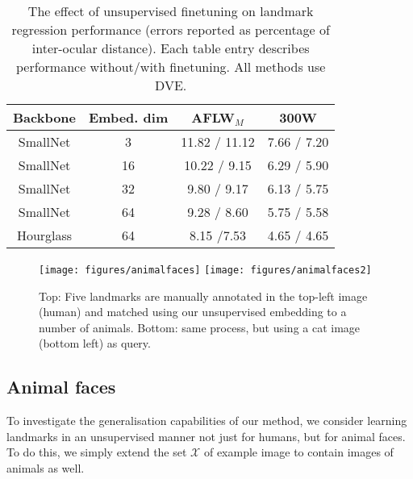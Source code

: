 \documentclass[10pt,twocolumn,letterpaper]{article}
\begin{document}
\begin{table}[t]
\setlength\tabcolsep{6.2pt}
\centering
\begin{tabular}{cccc}
\toprule
Backbone & Embed. dim & AFLW$_M$ & 300W \\
\midrule
SmallNet & 3  & 11.82 / 11.12 & 7.66 / 7.20 \\
SmallNet & 16 & 10.22 / 9.15 & 6.29 / 5.90  \\
SmallNet & 32 & 9.80 / 9.17 & 6.13 / 5.75  \\
SmallNet & 64 & 9.28 / 8.60 & 5.75 / 5.58  \\
Hourglass & 64 & 8.15 /7.53 & 4.65 / 4.65  \\
\bottomrule
\end{tabular}
\medskip
\caption{The effect of unsupervised finetuning on landmark regression performance (errors reported as percentage of inter-ocular distance). Each table entry describes performance without/with finetuning.  All methods use DVE.}
\vspace{-0.4cm}
\label{t:ftablation}
\end{table}

\begin{figure*}[t!]
\centering
\texttt{[image: figures/animalfaces]}\vspace{-2pt}
\texttt{[image: figures/animalfaces2]}
\caption{Top: Five landmarks are manually annotated in the top-left image (human) and matched using our unsupervised embedding to a number of animals.
Bottom: same process, but using a cat image (bottom left) as query.}\label{f:animalfaces}
\vspace{-1em}
\end{figure*}



\subsection{Animal faces}\label{s:cross}
To investigate the generalisation capabilities of our method, we consider learning landmarks in an unsupervised manner not just for humans, but for animal faces.
To do this, we simply extend the set $\mathcal{X}$ of example image to contain images of animals as well.
\end{document}
